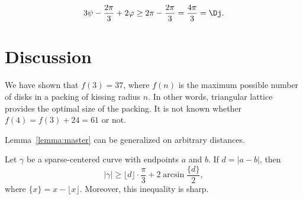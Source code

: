 \begin{enumerate}[label={\bf Case \arabic*: }, wide, labelwidth=!, labelindent=0pt]
$$3\psi - \frac{2\pi}{3} + 2\varphi\geq 2\pi - \frac{2\pi}{3} = \frac{4\pi}{3} = \Dj.$$


\end{enumerate}

\section{Discussion}

We have shown that $f(3) = 37$, where $f(n)$ is the maximum possible number of disks in a packing of kissing radius $n$. In other words, triangular lattice provides the optimal size of the packing. It is not known whether $f(4) = f(3) + 24 = 61$ or not.

Lemma~\ref{lemma:master} can be generalized on arbitrary distances.

\begin{lemma}
Let $\gamma$ be a sparse-centered curve with endpoints $a$ and $b$. If $d = |a - b|$, then
$$|\gamma|\geq \lfloor d\rfloor\cdot\frac{\pi}{3} + 2\arcsin\frac{\{d\}}{2},$$
where $\{x\} = x - \lfloor x\rfloor$. Moreover, this inequality is sharp.
\end{lemma}

